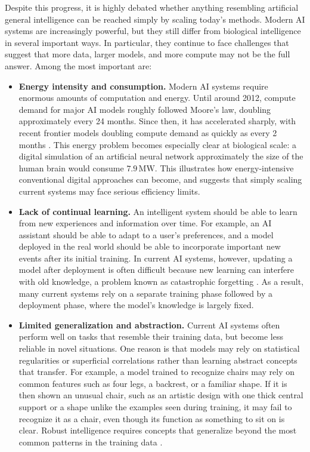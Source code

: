 Despite this progress, it is highly debated whether anything resembling artificial general intelligence can be reached simply by scaling today’s methods. Modern AI systems are increasingly powerful, but they still differ from biological intelligence in several important ways. In particular, they continue to face challenges that suggest that more data, larger models, and more compute may not be the full answer. Among the most important are:
\begin{itemize}

    \item \textbf{Energy intensity and consumption.} Modern AI systems require enormous amounts of computation and energy. Until around 2012, compute demand for major AI models roughly followed Moore's law, doubling approximately every 24 months. Since then, it has accelerated sharply, with recent frontier models doubling compute demand as quickly as every 2 months \parencite{mehonic_brain-inspired_2022}. This energy problem becomes especially clear at biological scale: a digital simulation of an artificial neural network approximately the size of the human brain would consume \(7.9\,\mathrm{MW}\). This illustrates how energy-intensive conventional digital approaches can become, and suggests that simply scaling current systems may face serious efficiency limits.

    \item \textbf{Lack of continual learning.} An intelligent system should be able to learn from new experiences and information over time. For example, an AI assistant should be able to adapt to a user's preferences, and a model deployed in the real world should be able to incorporate important new events after its initial training. In current AI systems, however, updating a model after deployment is often difficult because new learning can interfere with old knowledge, a problem known as catastrophic forgetting \parencite{mccloskey_catastrophic_1989}. As a result, many current systems rely on a separate training phase followed by a deployment phase, where the model's knowledge is largely fixed.

    \item \textbf{Limited generalization and abstraction.} Current AI systems often perform well on tasks that resemble their training data, but become less reliable in novel situations. One reason is that models may rely on statistical regularities or superficial correlations rather than learning abstract concepts that transfer. For example, a model trained to recognize chairs may rely on common features such as four legs, a backrest, or a familiar shape. If it is then shown an unusual chair, such as an artistic design with one thick central support or a shape unlike the examples seen during training, it may fail to recognize it as a chair, even though its function as something to sit on is clear. Robust intelligence requires concepts that generalize beyond the most common patterns in the training data \parencite{dehaene_how_2021}.
    

\end{itemize}
